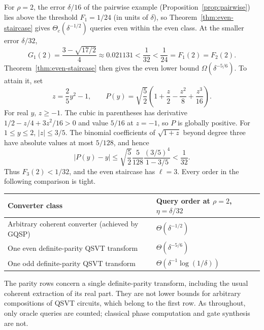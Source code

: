 For $\rho=2$, the error $\delta/16$ of the pairwise example (Proposition~\ref{prop:pairwise}) lies above the threshold $F_1=1/24$ (in units of $\delta$), so Theorem~\ref{thm:even-staircase} gives $\Theta_c(\delta^{-1/2})$ queries even within the even class. At the smaller error $\delta/32$,
\[
 G_1(2)=\frac{3-\sqrt{17/2}}4\approx0.021131
 <\frac1{32}<\frac1{24}=F_1(2)=F_2(2).
\]
Theorem~\ref{thm:even-staircase} then gives the even lower bound $\Omega(\delta^{-5/6})$. To attain it, set
\[
 z=\frac25y^2-1,\qquad
 P(y)=\sqrt{\frac52}\left(1+\frac z2-\frac{z^2}8+\frac{z^3}{16}\right).
\]
For real $y$, $z\geq-1$. The cubic in parentheses has derivative $1/2-z/4+3z^2/16>0$ and value $5/16$ at $z=-1$, so $P$ is globally positive. For $1\leq y\leq2$, $|z|\leq3/5$. The binomial coefficients of $\sqrt{1+z}$ beyond degree three have absolute values at most $5/128$, and hence
\[
 |P(y)-y|\leq\sqrt{\frac52}\frac5{128}
                    \frac{(3/5)^4}{1-3/5}<\frac1{32}.
\]
Thus $F_3(2)<1/32$, and the even staircase has $\ell=3$. Every order in the following comparison is tight.
\begin{center}
\begin{tabular}{ll}
\toprule
Converter class & Query order at $\rho=2$, $\eta=\delta/32$\\
\midrule
Arbitrary coherent converter (achieved by GQSP) & $\Theta(\delta^{-1/2})$\\
One even definite-parity QSVT transform & $\Theta(\delta^{-5/6})$\\
One odd definite-parity QSVT transform & $\Theta(\delta^{-1}\log(1/\delta))$\\
\bottomrule
\end{tabular}
\end{center}
The parity rows concern a single definite-parity transform, including the usual coherent extraction of its real part. They are not lower bounds for arbitrary compositions of QSVT circuits, which belong to the first row. As throughout, only oracle queries are counted; classical phase computation and gate synthesis are not.
